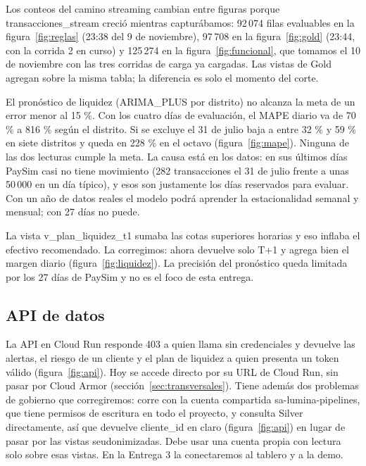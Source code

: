 \documentclass[11pt,a4paper]{article}
\DeclareRobustCommand{\cod}[1]{{\small\ttfamily\codbreaks #1}}
\DeclareRobustCommand{\codbreaks}{\let\oldus\_\renewcommand{\_}{\oldus\allowbreak}}
\begin{document}
Los conteos del camino streaming cambian entre figuras porque \cod{transacciones\_stream} creció mientras capturábamos: 92\,074 filas evaluables en la figura~\ref{fig:reglas} (23:38 del 9 de noviembre), 97\,708 en la figura~\ref{fig:gold} (23:44, con la corrida 2 en curso) y 125\,274 en la figura~\ref{fig:funcional}, que tomamos el 10 de noviembre con las tres corridas de carga ya cargadas. Las vistas de Gold agregan sobre la misma tabla; la diferencia es solo el momento del corte.

El pronóstico de liquidez (ARIMA\_PLUS por distrito) no alcanza la meta de un error menor al 15 \%. Con los cuatro días de evaluación, el MAPE diario va de 70 \% a 816 \% según el distrito. Si se excluye el 31 de julio baja a entre 32 \% y 59 \% en siete distritos y queda en 228 \% en el octavo (figura~\ref{fig:mape}). Ninguna de las dos lecturas cumple la meta. La causa está en los datos: en sus últimos días PaySim casi no tiene movimiento (282 transacciones el 31 de julio frente a unas 50\,000 en un día típico), y esos son justamente los días reservados para evaluar. Con un año de datos reales el modelo podrá aprender la estacionalidad semanal y mensual; con 27 días no puede.

La vista \cod{v\_plan\_liquidez\_t1} sumaba las cotas superiores horarias y eso inflaba el efectivo recomendado. La corregimos: ahora devuelve solo T+1 y agrega bien el margen diario (figura~\ref{fig:liquidez}). La precisión del pronóstico queda limitada por los 27 días de PaySim y no es el foco de esta entrega.

\subsection{API de datos}

La API en Cloud Run responde 403 a quien llama sin credenciales y devuelve las alertas, el riesgo de un cliente y el plan de liquidez a quien presenta un token válido (figura~\ref{fig:api}). Hoy se accede directo por su URL de Cloud Run, sin pasar por Cloud Armor (sección~\ref{sec:transversales}). Tiene además dos problemas de gobierno que corregiremos: corre con la cuenta compartida \cod{sa-lumina-pipelines}, que tiene permisos de escritura en todo el proyecto, y consulta Silver directamente, así que devuelve \cod{cliente\_id} en claro (figura~\ref{fig:api}) en lugar de pasar por las vistas seudonimizadas. Debe usar una cuenta propia con lectura solo sobre esas vistas. En la Entrega 3 la conectaremos al tablero y a la demo.
\end{document}
